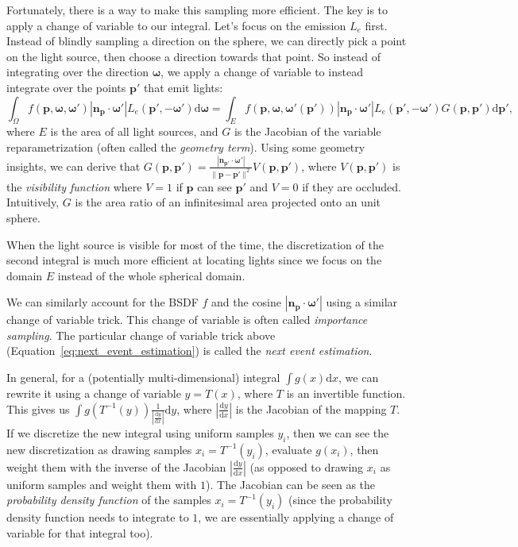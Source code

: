 Fortunately, there is a way to make this sampling more efficient. The key is to apply a change of variable to our integral. Let's focus on the emission $L_e$ first. Instead of blindly sampling a direction on the sphere, we can directly pick a point on the light source, then choose a direction towards that point. So instead of integrating over the direction $\mathbf{\omega}$, we apply a change of variable to instead integrate over the points $\mathbf{p}'$ that emit lights:
\begin{equation}
    \int_{\Omega} f(\mathbf{p}, \mathbf{\omega}, \mathbf{\omega}') |\mathbf{n}_{\mathbf{p}} \cdot \mathbf{\omega}'| L_e(\mathbf{p}', -\mathbf{\omega}') \mathrm{d} \mathbf{\omega} =
    \int_{E} f(\mathbf{p}, \mathbf{\omega}, \mathbf{\omega}'(\mathbf{p}')) |\mathbf{n}_{\mathbf{p}} \cdot \mathbf{\omega}'| L_e(\mathbf{p}', -\mathbf{\omega}') G(\mathbf{p}, \mathbf{p}') \mathrm{d} \mathbf{p}',
    \label{eq:next_event_estimation}
\end{equation}
where $E$ is the area of all light sources, and $G$ is the Jacobian of the variable reparametrization (often called the \emph{geometry term}). Using some geometry insights, we can derive that $G(\mathbf{p}, \mathbf{p}') = \frac{|\mathbf{n}_{\mathbf{p}'} \cdot \mathbf{\omega}'|}{\|\mathbf{p} - \mathbf{p}'\|^2} V(\mathbf{p}, \mathbf{p}')$, where $V(\mathbf{p}, \mathbf{p}')$ is the \emph{visibility function} where $V=1$ if $\mathbf{p}$ can see $\mathbf{p}'$ and $V=0$ if they are occluded. Intuitively, $G$ is the area ratio of an infinitesimal area projected onto an unit sphere.

When the light source is visible for most of the time, the discretization of the second integral is much more efficient at locating lights since we focus on the domain $E$ instead of the whole spherical domain.

We can similarly account for the BSDF $f$ and the cosine $|\mathbf{n}_{\mathbf{p}} \cdot \mathbf{\omega}'|$ using a similar change of variable trick. This change of variable is often called \emph{importance sampling}. The particular change of variable trick above (Equation~\ref{eq:next_event_estimation}) is called the \emph{next event estimation}.

In general, for a (potentially multi-dimensional) integral $\int g(x) \mathrm{d}x$, we can rewrite it using a change of variable $y = T(x)$, where $T$ is an invertible function. This gives us $\int g(T^{-1}(y)) \frac{1}{|\frac{\mathrm{d}y}{\mathrm{d}x}|} \mathrm{d}y$, where $|\frac{\mathrm{d}y}{\mathrm{d}x}|$ is the Jacobian of the mapping $T$. If we discretize the new integral using uniform samples $y_i$, then we can see the new discretization as drawing samples $x_i = T^{-1}(y_i)$, evaluate $g(x_i)$, then weight them with the inverse of the Jacobian $|\frac{\mathrm{d}y}{\mathrm{d}x}|$ (as opposed to drawing $x_i$ as uniform samples and weight them with $1$). The Jacobian can be seen as the \emph{probability density function} of the samples $x_i = T^{-1}(y_i)$ (since the probability density function needs to integrate to $1$, we are essentially applying a change of variable for that integral too). 

